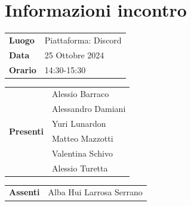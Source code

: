 \section{Informazioni incontro}
\vspace{0.25cm}
\begin{tabular}{p{1.75cm} | l}
    \textbf{Luogo} & Piattaforma: Discord\\
    \textbf{Data} & 25 Ottobre 2024\\
    \textbf{Orario} & 14:30-15:30\\
\end{tabular}

\vspace{0.5cm}
\noindent
\begin{tabular}{p{1.75cm} | l}
    \multirow{7}{*}{\textbf{Presenti}}
        & Alessio Barraco\\
        & Alessandro Damiani\\ %
        & Yuri Lunardon\\
        & Matteo Mazzotti\\
        & Valentina Schivo\\
        & Alessio Turetta
\end{tabular}

\vspace{0.5cm}
\noindent
\begin{tabular}{p{1.75cm} | l}
    \multirow{1}{*}{\textbf{Assenti}}
        & Alba Hui Larrosa Serrano\\
\end{tabular}

\vspace{0.5cm}
\noindent
\begin{tabular}{p{1.75cm} | l}
\end{tabular}
